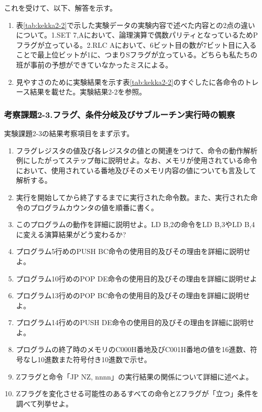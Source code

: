 \documentclass[11pt,a4j]{jsarticle}
\begin{document}
   これを受けて、以下、解答を示す。
   \begin{enumerate}
   \item 表\ref{tab:kekka2-2}で示した実験データの実験内容で述べた内容との2点の違いについて。1.SET 7,Aにおいて、論理演算で偶数パリティとなっているためPフラグが立っている。2.RLC Aにおいて、6ビット目の数が7ビット目に入ることで最上位ビットが1に、つまりSフラグが立っている。どちらも私たちの班が事前の予想ができていなかったミスによる。
   \item 見やすさのために実験結果を示す表\ref{tab:kekka2-2}のすぐしたに各命令のトレース結果を載せた。実験結果2-2を参照。
   \end{enumerate}
   
   
   \subsubsection{考察課題2-3.フラグ、条件分岐及びサブルーチン実行時の観察}
   
   実験課題2-3の結果考察項目をまず示す。
   \begin{enumerate}
   \item フラグレジスタの値及び各レジスタの値との関連をつけて、命令の動作解析例にしたがってステップ毎に説明せよ。なお、メモリが使用されている命令において、使用されている番地及びそのメモリ内容の値についても言及して解析する。
   \item 実行を開始してから終了するまでに実行された命令数。また、実行された命令のプログラムカウンタの値を順番に書く。
   \item このプログラムの動作を詳細に説明せよ。LD B,2の命令をLD B,3やLD B,4に変える演算結果がどう変わるか?
   \item プログラム5行めのPUSH BC命令の使用目的及びその理由を詳細に説明せよ。
   \item プログラム10行めのPOP DE命令の使用目的及びその理由を詳細に説明せよ
   \item プログラム13行めのPOP BC命令の使用目的及びその理由を詳細に説明せよ。
   \item プログラム14行めのPUSH DE命令の使用目的及びその理由を詳細に説明せよ。
   \item プログラムの終了時のメモリのC000H番地及びC001H番地の値を16進数、符号なし10進数また符号付き10進数で示せ。
   \item Zフラグと命令「JP NZ, nnnn」の実行結果の関係について詳細に述べよ。
   \item Zフラグを変化させる可能性のあるすべての命令とZフラグが「立つ」条件を調べて列挙せよ。
   \end{enumerate}
   
\end{document}
